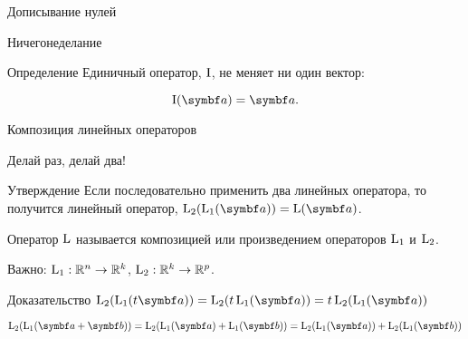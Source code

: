 \begin{frame}{Дописывание нулей}
\begin{minipage}{0.60\linewidth}

\end{minipage}


\end{frame}


\begin{frame}{Ничегонеделание}

	\begin{block}{Определение}
	\alert{Единичный} оператор, $\mathrm{I}$, не меняет ни один вектор:

    \[
		\Id(\ba) = \ba.
	\]
	\end{block}


\end{frame}






\begin{frame}{Композиция линейных операторов}

\alert{Делай раз, делай два!}
\pause
\begin{block}{Утверждение}
Если последовательно применить два линейных оператора, 
    то получится линейный оператор, $\LL_2 (\LL_1 (\ba)) = \LL(\ba)$.
\end{block}

Оператор $\operatorname{L}$ называется \alert{композицией} или \alert{произведением} операторов $\operatorname{L}_1$ и $\operatorname{L}_2$.

\pause
Важно: $\operatorname{L}_1 : \mathbb{R}^n \to \mathbb{R}^k$, $\operatorname{L}_2 : \mathbb{R}^k \to \mathbb{R}^p$.
\pause
\begin{block}{Доказательство}
$
\LL_2 (\LL_1 (t \ba)) = \LL_2 (t \LL_1 (\ba)) = t \LL_2(\LL_1(\ba))
$ \pause

$
\LL_2 (\LL_1 (\ba + \bb)) = \LL_2 (\LL_1 (\ba) + \LL_1(\bb)) = \LL_2(\LL_1(\ba)) + \LL_2(\LL_1(\bb))
$
\end{block}



\end{frame}


